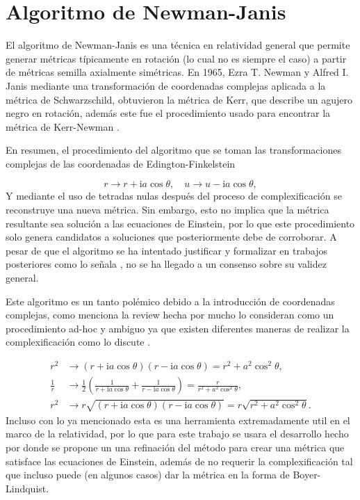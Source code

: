 
\section[Algoritmo de Newman-Janis]{Algoritmo de Newman-Janis}

El algoritmo de Newman-Janis es una técnica en relatividad general que permite generar métricas típicamente en rotación (lo cual no es siempre el caso) a partir de métricas semilla  axialmente simétricas. En 1965, Ezra T. Newman y Alfred I. Janis \cite{newman-1965}  mediante una transformación de coordenadas complejas aplicada a la métrica de Schwarzschild, obtuvieron la métrica de Kerr, que describe un agujero negro en rotación, además este fue el procedimiento usado para encontrar la métrica de Kerr-Newman\cite{newman-1965b} .

En resumen, el procedimiento del algoritmo que se toman las transformaciones complejas de las coordenadas de Edington-Finkelstein 

\begin{equation}
r \rightarrow r+\mathrm{i} a \cos \theta, \quad u \rightarrow u-\mathrm{i} a \cos \theta,
\end{equation}
Y mediante el uso de tetradas nulas después del proceso de complexificación se reconstruye una nueva métrica. Sin embargo, esto no implica que la métrica resultante sea solución a las ecuaciones de Einstein, por lo que este procedimiento solo genera candidatos a soluciones que posteriormente debe de corroborar.
A pesar de que el algoritmo se ha intentado justificar y formalizar en trabajos posteriores como lo señala \cite{drake-2000}, no se ha llegado a un consenso sobre su validez general.

Este algoritmo es un tanto polémico debido a la introducción de coordenadas complejas, como menciona la review hecha por \cite{drake-2000} mucho lo consideran como un procedimiento ad-hoc y ambiguo ya que existen diferentes maneras de realizar la complexificación como lo discute \cite{azreg-ainou-2014} .

\begin{align}
r^2 & \rightarrow(r+\mathrm{i} a \cos \theta)(r-\mathrm{i} a \cos \theta)=r^2+a^2 \cos ^2 \theta, \\
\frac{1}{r}& \rightarrow \frac{1}{2}\left(\frac{1}{r+\mathrm{i} a \cos \theta}+\frac{1}{r-\mathrm{i} a \cos \theta}\right)=\frac{r}{r^2+a^2 \cos ^2 \theta}, \\
r^2 & \rightarrow r \sqrt{(r+\mathrm{i} a \cos \theta)(r-\mathrm{i} a \cos \theta)}=r \sqrt{r^2+a^2 \cos ^2 \theta} .
\end{align}
Incluso con lo ya mencionado esta es una herramienta extremadamente util en el marco de la relatividad, por lo que para este trabajo se usara el desarrollo hecho por \cite{azreg-ainou-2014} donde se propone un una refinación del método para crear una métrica que satisface las ecuaciones de Einstein, además de no requerir la complexificación tal que incluso puede (en algunos casos) dar la métrica en la forma de Boyer-Lindquist.

